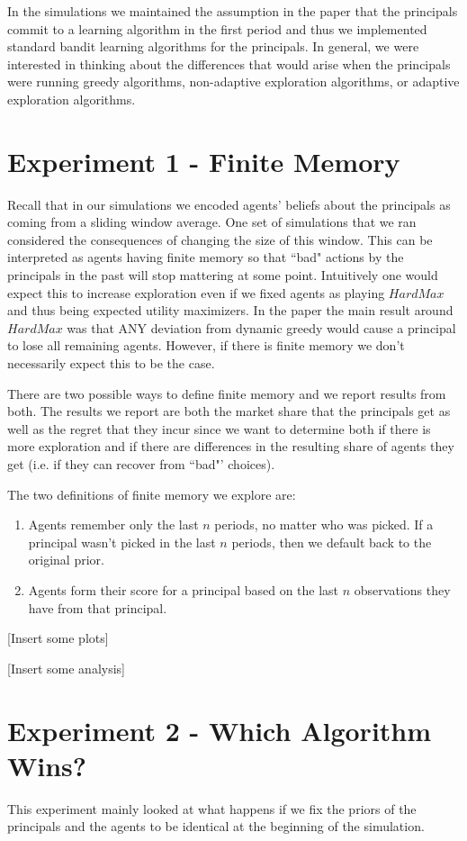 \documentclass[a4paper]{article}
\begin{document}
In the simulations we maintained the assumption in the paper that the principals commit to a learning algorithm in the first period and thus we implemented standard bandit learning algorithms for the principals. In general, we were interested in thinking about the differences that would arise when the principals were running greedy algorithms, non-adaptive exploration algorithms, or adaptive exploration algorithms.

\section*{Experiment 1 - Finite Memory}
Recall that in our simulations we encoded agents' beliefs about the principals as coming from a sliding window average. One set of simulations that we ran considered the consequences of changing the size of this window. This can be interpreted as agents having finite memory so that ``bad" actions by the principals in the past will stop mattering at some point. Intuitively one would expect this to increase exploration even if we fixed agents as playing $HardMax$ and thus being expected utility maximizers. In the paper the main result around $HardMax$ was that ANY deviation from dynamic greedy would cause a principal to lose all remaining agents. However, if there is finite memory we don't necessarily expect this to be the case.

There are two possible ways to define finite memory and we report results from both. The results we report are both the market share that the principals get as well as the regret that they incur since we want to determine both if there is more exploration and if there are differences in the resulting share of agents they get (i.e. if they can recover from ``bad"' choices).

The two definitions of finite memory we explore are:
\begin{enumerate}
\item Agents remember only the last $n$ periods, no matter who was picked. If a principal wasn't picked in the last $n$ periods, then we default back to the original prior.
\item Agents form their score for a principal based on the last $n$ observations they have from that principal.
\end{enumerate}

[Insert some plots]

[Insert some analysis]

\section*{Experiment 2 - Which Algorithm Wins?}
This experiment mainly looked at what happens if we fix the priors of the principals and the agents to be identical at the beginning of the simulation.
\end{document}
